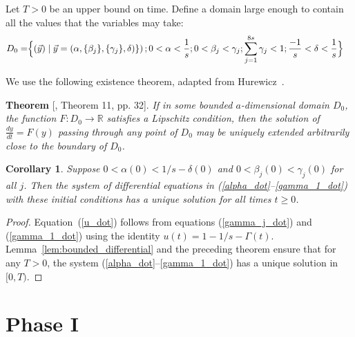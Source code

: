 \documentclass[a4paper,12pt]{article}
\newtheorem{corollary}{Corollary}
\begin{document}
Let $T > 0 $ be an upper bound on time. Define a domain large enough to contain all the values that the variables may take:
\begin{align} \label{def:domain_0}
D_0 = & \Bigl\{(\vec{y}) \mid \vec{y} =
\left(\alpha, \{\beta_j\}, \{\gamma_j\}, \delta)\}\right); 0 < \alpha < \frac{1}{s} ; 0 < \beta_j < \gamma_j ; \sum_{j=1}^{8s} \gamma_j < 1 ; \frac{-1}{s} < \delta < \frac{1}{s} \Bigr\}
\end{align}

We use the following existence theorem, adapted from Hurewicz~\cite{hurewitz_book}.

\medskip

\noindent \textbf{Theorem} [\cite{hurewitz_book}, Theorem 11, pp. 32].
\emph{If in some bounded $a$-dimensional domain $D_0$, the function $F:D_0 \to {\mathbb R}$ satisfies a Lipschitz condition, then the solution of $\frac{dy}{dt}=F(y)$ passing through any point of $D_0$ may be uniquely extended arbitrarily close to the boundary of $D_0$.}

\medskip

\begin{corollary} \label{cor:hurewicz}
Suppose $0 < \alpha(0) < 1/s - \delta(0)$ and $0 < \beta_j(0) < \gamma_j(0)$ for all $j$. Then the system of differential equations in (\ref{alpha_dot}--\ref{gamma_1_dot}) with these initial conditions has a unique solution for all times $t \geq 0$.
\end{corollary}
\begin{proof}
Equation~(\ref{u_dot}) follows from equations (\ref{gamma_j_dot}) and (\ref{gamma_1_dot}) using the identity $u(t) = 1 - 1/s - \Gamma(t)$.
Lemma~\ref{lem:bounded_differential} and the preceding theorem ensure that for any $T > 0$, the system (\ref{alpha_dot}--\ref{gamma_1_dot}) has a unique solution in $[0,T)$.
\end{proof}

\section{Phase I} \label{sec:phase_1}
\end{document}

